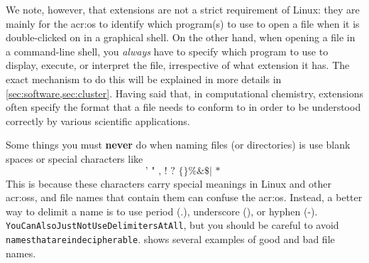     We note, however, that extensions are not a strict requirement of Linux: they are mainly for the \gls*{acr:os} to identify which program(s) to use to open a file when it is double-clicked on in a graphical shell.
    On the other hand, when opening a file in a command-line shell, you \emph{always} have to specify which program to use to display, execute, or interpret the file, irrespective of what extension it has.
    The exact mechanism to do this will be explained in more details in \cref{sec:software,sec:cluster}.
    Having said that, in computational chemistry, extensions often specify the format that a file needs to conform to in order to be understood correctly by various scientific applications.

    Some things you must \textbf{never} do when naming files (or directories) is use blank spaces or special characters like
    \begin{equation*}
      \texttt{' " , ! ? \{ \} \% \& \$ | * \^{} }
    \end{equation*}
    This is because these characters carry special meanings in Linux and other \glspl*{acr:os}, and file names that contain them can confuse the \gls*{acr:os}.
    Instead, a better way to delimit a name is to use period (.), underscore (\textunderscore), or hyphen (-).
    \texttt{YouCanAlsoJustNotUseDelimitersAtAll}, but you should be careful to avoid \texttt{namesthatareindecipherable}.
     shows several examples of good and bad file names.

